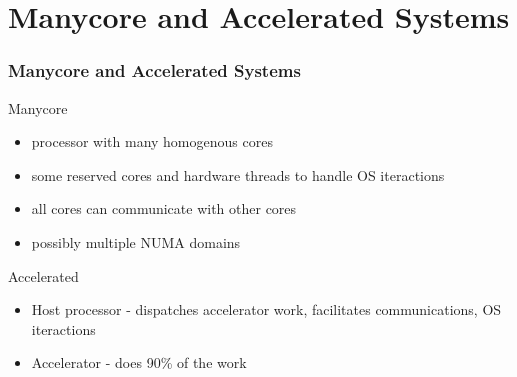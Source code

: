 \documentclass[aspectratio=169]{beamer}
\begin{document}
\section{Manycore and Accelerated Systems}
\begin{frame}
  \frametitle{Manycore and Accelerated Systems}
  Manycore
  \begin{itemize}
    \item processor with many homogenous cores
    \item some reserved cores and hardware threads to handle OS iteractions
    \item all cores can communicate with other cores
    \item possibly multiple NUMA domains
  \end{itemize}
  Accelerated
  \begin{itemize}
    \item Host processor - dispatches accelerator work, facilitates
      communications, OS iteractions
    \item Accelerator - does 90\% of the work
  \end{itemize}
\end{frame}

\end{document}
